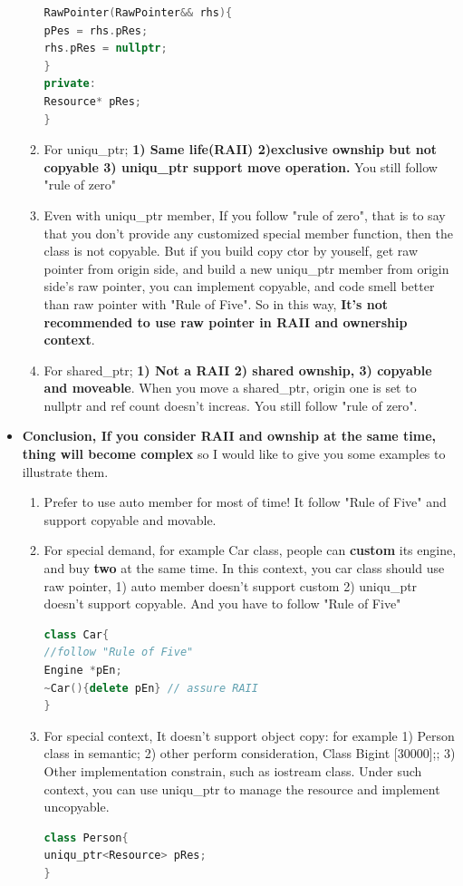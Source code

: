 \documentclass[a4paper,12pt,twoside]{book}
\begin{document}
\begin{itemize}
\begin{enumerate}
\begin{lstlisting}[frame=single, language=c++]
RawPointer(RawPointer&& rhs){
pPes = rhs.pRes;
rhs.pRes = nullptr;
}
private:
Resource* pRes;
}
\end{lstlisting}

\item For uniqu\_ptr; \textbf{1) Same life(RAII) 2)exclusive ownship but not copyable 3) uniqu\_ptr support move operation. } You still follow "rule of zero"

\item Even with uniqu\_ptr member, If you follow "rule of zero", that is to say that you don't provide any customized special member function, then the class is not copyable. But if you build copy ctor by youself, get raw pointer from origin side, and build a new uniqu\_ptr member from origin side's raw pointer, you can implement copyable, and code smell better than raw pointer with "Rule of Five". So in this way, \textbf{It's not recommended to use raw pointer in RAII and ownership context}.

\item For shared\_ptr; \textbf{1) Not a RAII 2) shared ownship, 3) copyable and moveable}. When you move a shared\_ptr, origin one is set to nullptr and ref count doesn't increas.  You still follow "rule of zero".

\end{enumerate}

\item \textbf{ Conclusion, If you consider RAII and ownship at the same time, thing will become complex} so I would like to give you some examples to illustrate them.

\begin{enumerate}
\item Prefer to use auto member for most of time! It follow "Rule of Five" and support copyable and movable.

\item  For special demand, for example Car class,  people can \textbf{custom} its engine, and buy \textbf{two} at the same time. In this context, you car class should use raw pointer, 1) auto member doesn't support custom 2) uniqu\_ptr doesn't support copyable.  And you have to follow "Rule of Five"
\begin{lstlisting}[frame=single, language=c++]
class Car{
//follow "Rule of Five"
Engine *pEn;
~Car(){delete pEn} // assure RAII
}
\end{lstlisting}

\item For special context, It doesn't support object copy: for example 1) Person class in semantic;  2) other  perform consideration, Class Big{int [30000];};  3) Other implementation constrain, such as iostream class.   Under such context, you can use uniqu\_ptr to manage the resource and implement uncopyable.
\begin{lstlisting}[frame=single, language=c++]
class Person{
uniqu_ptr<Resource> pRes;
}
\end{lstlisting}


\end{enumerate}
\end{itemize}
\end{document}

